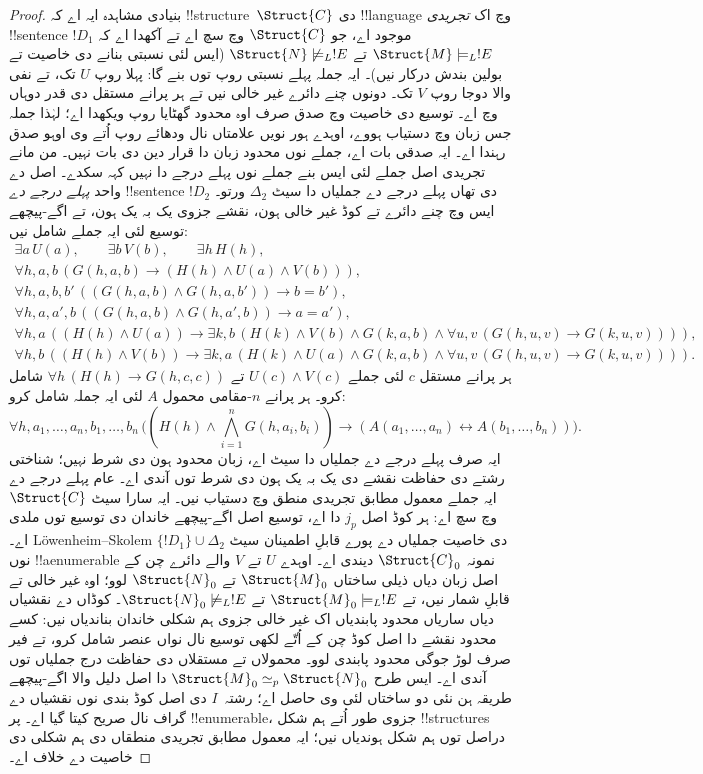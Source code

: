 \documentclass[../../../include/open-logic-section]{subfiles}
\begin{document}
\begin{proof}
بنیادی مشاہدہ ایہ اے کہ !!{structure}~$\Struct{C}$ دی
!!{language} وچ اک \emph{تجریدی} !!{sentence} $!D_1$
موجود اے، جو $\Struct{C}$ وچ سچ اے تے آکھدا اے کہ
$\Struct{M} \models_L !E$ تے
$\Struct{N} \not\models_L !E$ (ایس لئی نسبتی بنانے
دی خاصیت تے بولین بندش درکار نیں)۔ ایہ جملہ پہلے نسبتی روپ
توں بنے گا: پہلا روپ $U$ تک، تے نفی والا دوجا روپ $V$ تک۔
دونوں چنے دائرے غیر خالی نیں تے ہر پرانے مستقل دی قدر دوہاں وچ اے۔
توسیع دی خاصیت وچ صدق صرف اوہ محدود گھٹایا روپ ویکھدا اے؛
لہٰذا جملہ جس زبان وچ دستیاب ہووے، اوہدے ہور نویں علامتاں نال
ودھائے روپ اُتے وی اوہو صدق رہندا اے۔ ایہ صدقی بات اے، جملے نوں
محدود زبان دا قرار دین دی بات نہیں۔ من مانے تجریدی اصل جملے لئی
ایس بنے جملے نوں پہلے درجے دا نہیں کہہ سکدے۔
اصل دے واحد \emph{پہلے درجے دے} !!{sentence} $!D_2$ دی تھاں
پہلے درجے دے جملیاں دا سیٹ $\Delta_2$ ورتو۔ ایس وچ چنے دائرے
تے کوڈ غیر خالی ہون، نقشے جزوی یک بہ یک ہون، تے اگے-پیچھے
توسیع لئی ایہ جملے شامل نیں:
\[
\begin{gathered}
\exists a\,U(a),\qquad \exists b\,V(b),\qquad \exists h\,H(h),\\
\forall h,a,b\,(G(h,a,b)\to(H(h)\land U(a)\land V(b))),\\
\forall h,a,b,b'\,((G(h,a,b)\land G(h,a,b'))\to b=b'),\\
\forall h,a,a',b\,((G(h,a,b)\land G(h,a',b))\to a=a'),\\
\forall h,a\,((H(h)\land U(a))\to
\exists k,b\,(H(k)\land V(b)\land G(k,a,b)\land
\forall u,v\,(G(h,u,v)\to G(k,u,v)))),\\
\forall h,b\,((H(h)\land V(b))\to
\exists k,a\,(H(k)\land U(a)\land G(k,a,b)\land
\forall u,v\,(G(h,u,v)\to G(k,u,v)))).
\end{gathered}
\]
ہر پرانے مستقل $c$ لئی جملے $U(c)\land V(c)$ تے
$\forall h\,(H(h)\to G(h,c,c))$ شامل کرو۔ ہر پرانے
$n$-مقامی محمول $A$ لئی ایہ جملہ شامل کرو:
\[
\forall h,a_1,\ldots,a_n,b_1,\ldots,b_n\,
\bigl((H(h)\land\bigwedge_{i=1}^{n}G(h,a_i,b_i))\to
(A(a_1,\ldots,a_n)\leftrightarrow A(b_1,\ldots,b_n))\bigr).
\]
ایہ صرف پہلے درجے دے جملیاں دا سیٹ اے، زبان محدود ہون دی شرط
نہیں؛ شناختی رشتے دی حفاظت نقشے دی یک بہ یک ہون دی شرط توں آندی اے۔
عام پہلے درجے دے ایہ جملے معمول مطابق تجریدی منطق وچ دستیاب نیں۔
ایہ سارا سیٹ $\Struct{C}$ وچ سچ اے: ہر کوڈ اصل $j_p$ دا اے،
توسیع اصل اگے-پیچھے خاندان دی توسیع توں ملدی اے۔
L\"owenheim--Skolem دی خاصیت جملیاں دے پورے قابلِ اطمینان سیٹ
$\{!D_1\}\cup\Delta_2$ نوں !!a{enumerable}
نمونہ $\Struct{C}_0$ دیندی اے۔ اوہدے $U$ تے $V$ والے دائرے
چن کے اصل زبان دیاں ذیلی ساختاں $\Struct{M}_0$ تے
$\Struct{N}_0$ لوو؛ اوہ غیر خالی تے قابلِ شمار نیں، تے
$\Struct{M}_0 \models_L !E$ تے
$\Struct{N}_0
\not\models_L !E$۔ کوڈاں دے نقشیاں دیاں ساریاں محدود پابندیاں
اک غیر خالی جزوی ہم شکلی خاندان بناندیاں نیں: کسے محدود نقشے
دا اصل کوڈ چن کے اُتّے لکھی توسیع نال نواں عنصر شامل کرو، تے
فیر صرف لوڑ جوگی محدود پابندی لوو۔ محمولاں تے مستقلاں دی حفاظت
درج جملیاں توں آندی اے۔ ایس طرح $\Struct{M}_0 \simeq_p \Struct{N}_0$
دا اصل دلیل والا اگے-پیچھے طریقہ ہن نئی دو ساختاں لئی وی حاصل اے؛
رشتہ~$I$ دی اصل کوڈ بندی نوں نقشیاں دے گراف نال صریح کیتا گیا اے۔
پر !!{enumerable}، جزوی طور اُتے
ہم شکل !!{structure}s دراصل
 توں ہم شکل ہوندیاں نیں؛
ایہ معمول مطابق تجریدی منطقاں دی ہم شکلی دی خاصیت دے خلاف اے۔
\end{proof}
\end{document}
